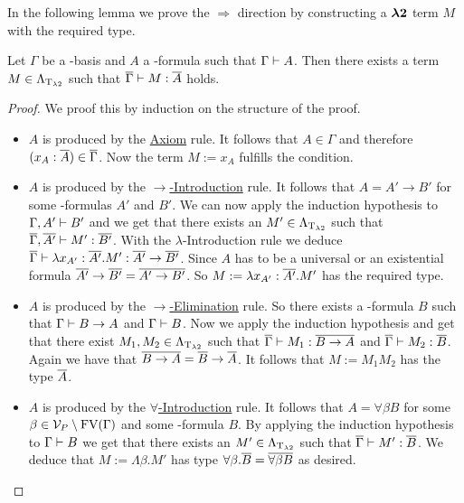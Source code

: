 In the following lemma we prove the $\Rightarrow$ direction by constructing a $\boldsymbol{\lambda2}$ term $M$ with the required type.

\begin{lemma}\label{lem.4.2}
Let $\Gamma$ be a \SysP-basis and $A$ a \SysP-formula such that $\Gamma\vdash A$. Then there exists a term $M\in\Lambda_{\text{T}_{\lambda2}}$ such that $\overline{\Gamma}\vdash M:\overline{A}$ holds.
\end{lemma}
\begin{proof}
We proof this by induction on the structure of the proof. %

\begin{itemize}
	\item[] $A$ is produced by the \underline{Axiom} rule. It follows that $A\in\Gamma$ and therefore $(x_A:\overline{A})\in\overline{\Gamma}$. Now the term $M:=x_A$ fulfills the condition.
	
	\item[] $A$ is produced by the \underline{$\rightarrow$-Introduction} rule. It follows that $A=A'\to B'$ for some \SysP-formulas $A'$ and $B'$. We can now apply the induction hypothesis to $\Gamma,A'\vdash B'$ and we get that there exists an $M'\in\Lambda_{\text{T}_{\lambda2}}$ such that $\overline{\Gamma},\overline{A'}\vdash M':\overline{B'}$. With the $\lambda$-Introduction rule we deduce $\overline{\Gamma}\vdash \lambda x_{A'}:\overline{A'}.M':\overline{A'}\to\overline{B'}$. Since $A$ has to be a universal or an existential formula $\overline{A'}\to\overline{B'}=\overline{A'\to B'}$. So $M:=\lambda x_{A'}:\overline{A'}.M'$ has the required type.
	
	\item[] $A$ is produced by the \underline{$\rightarrow$-Elimination} rule. So there exists a \SysP-formula $B$ such that $\Gamma\vdash B\to A$ and $\Gamma\vdash B$. Now we apply the induction hypothesis and get that there exist $M_1,M_2\in\Lambda_{\text{T}_{\lambda2}}$ such that $\overline{\Gamma}\vdash M_1:\overline{B\to A}$ and $\overline{\Gamma}\vdash M_2:\overline{B}$. Again we have that $\overline{B\to A}=\overline{B}\to\overline{A}$. It follows that $M:=M_1M_2$ has the type $\overline{A}$.
	
	\item[] $A$ is produced by the \underline{$\forall$-Introduction} rule. It follows that $A=\forall\beta B$ for some $\beta\in\mathcal{V}_P\setminus\text{FV}(\Gamma)$ and some \SysP-formula $B$. By applying the induction hypothesis to $\Gamma\vdash B$ we get that there exists an $M'\in\Lambda_{\text{T}_{\lambda2}}$ such that $\overline{\Gamma}\vdash M':\overline{B}$. We deduce that $M:=\Lambda\beta.M'$ has type $\forall\beta.\overline{B}=\overline{\forall\beta B}$ as desired. 
	

\end{itemize}
\end{proof}
